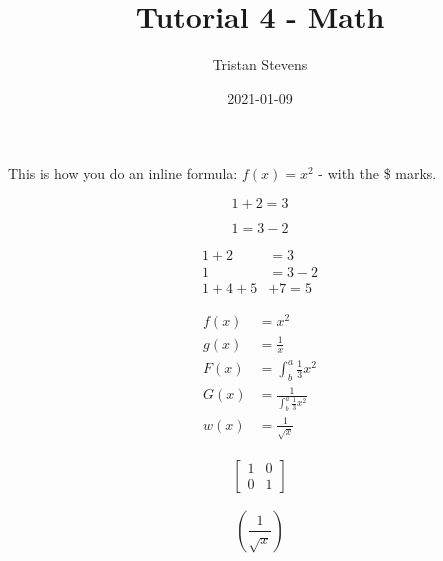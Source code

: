 \documentclass{article}
\title{Tutorial 4 - Math}
\date{2021-01-09}
\author{Tristan Stevens}
\begin{document}
\maketitle
\newpage

This is how you do an inline formula: $f(x)=x^2$ - with the \$ marks.

\begin{equation*}
	1+2=3
\end{equation*}

\begin{equation*}
	1=3-2
\end{equation*}


\begin{align*}
1+2&=3\\
1&=3-2\\
1+4+5&+7=5
\end{align*}

\begin{align*}
f(x)&=x^2\\
g(x)&=\frac{1}{x}\\
F(x)&=\int^a_b \frac{1}{3}x^2\\
G(x)&=\frac{1}{\int^a_b \frac{1}{3}x^2}\\
w(x)&=\frac{1}{\sqrt{x}}
\end{align*}

\begin{align*}
\left[
\begin{matrix}
1 & 0\\
0 & 1
\end{matrix}
\right]
\end{align*}

\begin{equation*}
\left(\frac{1}{\sqrt{x}}\right)
\end{equation*}
\end{document}
